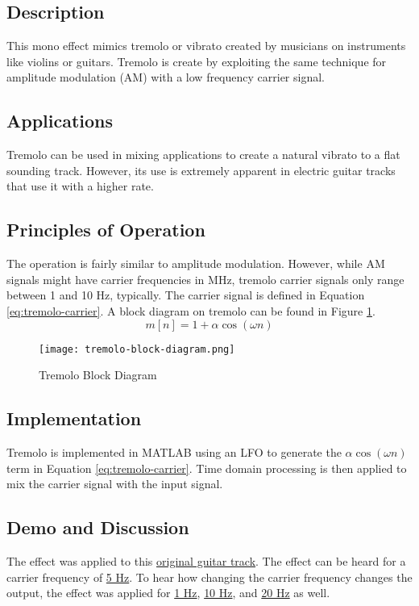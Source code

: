\subsection{Description}
This mono effect mimics tremolo or vibrato created by musicians on instruments like violins or guitars. Tremolo is create by exploiting the same technique for amplitude modulation (AM) with a low frequency carrier signal.

\subsection{Applications}
Tremolo can be used in mixing applications to create a natural vibrato to a flat sounding track. However, its use is extremely apparent in electric guitar tracks that use it with a higher rate.

\subsection{Principles of Operation}
The operation is fairly similar to amplitude modulation. However, while AM signals might have carrier frequencies in MHz, tremolo carrier signals only range between 1 and 10 Hz, typically. The carrier signal is defined in Equation \ref{eq:tremolo-carrier}. A block diagram on tremolo can be found in Figure \ref{fig:tremolo-block-diagram}.
\begin{equation}
    m[n] = 1 + \alpha \cos(\omega n)
    \label{eq:tremolo-carrier}
\end{equation}
\begin{figure}[ht]
    \centering
    \texttt{[image: tremolo-block-diagram.png]}
    \caption{Tremolo Block Diagram}
    \label{fig:tremolo-block-diagram}
\end{figure}

\subsection{Implementation}
Tremolo is implemented in MATLAB using an LFO to generate the $\alpha \cos(\omega n)$ term in Equation \ref{eq:tremolo-carrier}. Time domain processing is then applied to mix the carrier signal with the input signal.

\subsection{Demo and Discussion}
The effect was applied to this \href{run:../InputAudio/22-004 Original Guitar.wav}{original guitar track}. The effect can be heard for a carrier frequency of \href{run:../OutputAudio/tremolo_22-004 Original Guitar_{depth=1}{f_LFO=5Hz}.wav}{5 Hz}. To hear how changing the carrier frequency changes the output, the effect was applied for \href{run:../OutputAudio/tremolo_22-004 Original Guitar_{depth=1}{f_LFO=1Hz}.wav}{1 Hz}, \href{run:../OutputAudio/tremolo_22-004 Original Guitar_{depth=1}{f_LFO=10Hz}.wav}{10 Hz}, and \href{run:../OutputAudio/tremolo_22-004 Original Guitar_{depth=1}{f_LFO=20Hz}.wav}{20 Hz} as well.

